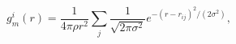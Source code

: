 \documentclass[12pt]{article}
\begin{document}
\thispagestyle{empty}

$$
   g_m^i(r) = \frac{1}{4 \pi \rho r^2} \sum\limits_{j} \frac{1}{\sqrt{2 \pi \sigma^2}} e^{-(r-r_{ij})^2/(2\sigma^2)} ,
$$
\end{document}
